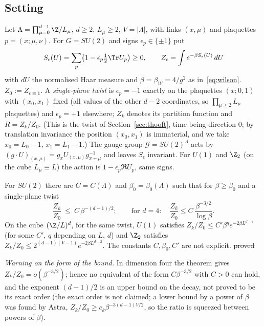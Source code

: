 \subsection{Setting}
Let $\Lambda=\prod_{\mu=0}^{d-1}\Z/L_\mu$, $d\ge2$, $L_\mu\ge2$, $V=|\Lambda|$, with links $(x,\mu)$ and plaquettes $p=(x;\mu,\nu)$. For $G=SU(2)$ and signs $\epsilon_p\in\{\pm1\}$ put
\[
S_\epsilon(U)=\sum_p\bigl(1-\epsilon_p\tfrac12\Tr U_p\bigr)\ge0,\qquad Z_\epsilon=\int e^{-\beta S_\epsilon(U)}\,dU
\]
with $dU$ the normalised Haar measure and $\beta=\beta_W=4/g^2$ as in~\eqref{eq:wilson}. $Z_0:=Z_{\epsilon\equiv1}$. A \emph{single-plane twist} is $\epsilon_p=-1$ exactly on the plaquettes $(x;0,1)$ with $(x_0,x_1)$ fixed (all values of the other $d-2$ coordinates, so $\prod_{\mu\ge2}L_\mu$ plaquettes) and $\epsilon_p=+1$ elsewhere; $Z_k$ denotes its partition function and $R=Z_k/Z_0$. (This is the twist of Section~\ref{sec:thooft}, time being direction $0$; by translation invariance the position $(x_0,x_1)$ is immaterial, and we take $x_0=L_0-1$, $x_1=L_1-1$.) The gauge group $\mathcal G=SU(2)^\Lambda$ acts by $(g\cdot U)_{(x,\mu)}=g_xU_{(x,\mu)}g_{x+\mu}^{-1}$ and leaves $S_\epsilon$ invariant. For $U(1)$ and $\Z_2$ (on the cube $L_\mu\equiv L$) the action is $1-\epsilon_p\Re U_p$, same signs.

\begin{theorem}\label{thm:L}
For $SU(2)$ there are $C=C(\Lambda)$ and $\beta_0=\beta_0(\Lambda)$ such that for $\beta\ge\beta_0$ and a single-plane twist
\[
\frac{Z_k}{Z_0}\ \le\ C\,\beta^{-(d-1)/2};\qquad\text{for }d=4:\quad \frac{Z_k}{Z_0}\le C\,\frac{\beta^{-3/2}}{\log\beta}.
\]
On the cube $(\Z/L)^d$, for the same twist, $U(1)$ satisfies $Z_k/Z_0\le C'\beta^{q}e^{-2\beta L^{d-4}}$ (for some $C'$, $q$ depending on $L$, $d$) and $\Z_2$ satisfies $Z_k/Z_0\le2^{(d-1)(V-1)}e^{-2\beta L^{d-2}}$. The constants $C,\beta_0,C'$ are not explicit. \st{proved}
\end{theorem}
\emph{Warning on the form of the bound.} In dimension four the theorem gives $Z_k/Z_0=o(\beta^{-3/2})$; hence no equivalent of the form $C\beta^{-3/2}$ with $C>0$ can hold, and the exponent $(d-1)/2$ is an upper bound on the decay, not proved to be its exact order (the exact order is not claimed; a lower bound by a power of $\beta$ was found by Astra, $Z_k/Z_0\ge c_k\beta^{-3(d-1)V/2}$, so the ratio is squeezed between powers of $\beta$).

